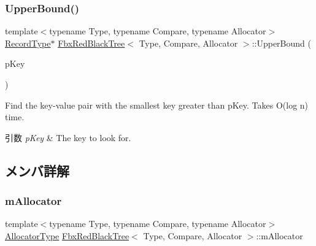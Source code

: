 \subsubsection{\texorpdfstring{Upper\+Bound()}{UpperBound()}\hspace{0.1cm}{\footnotesize\ttfamily [2/2]}}
{\footnotesize\ttfamily template$<$typename Type, typename Compare, typename Allocator$>$ \\
\hyperlink{class_fbx_red_black_tree_1_1_record_type}{Record\+Type}$\ast$ \hyperlink{class_fbx_red_black_tree}{Fbx\+Red\+Black\+Tree}$<$ Type, Compare, Allocator $>$\+::Upper\+Bound (\begin{DoxyParamCaption}\item[{const \hyperlink{class_fbx_red_black_tree_a241b31c6972995417d193458b7bb27e2}{Key\+Type} \&}]{p\+Key }\end{DoxyParamCaption})}

Find the key-\/value pair with the smallest key greater than p\+Key. Takes O(log n) time. 
\begin{DoxyParams}{引数}
{\em p\+Key} & The key to look for. \\
\hline
\end{DoxyParams}


\subsection{メンバ詳解}
\mbox{\label{class_fbx_red_black_tree_aefc2938bd74cea7e072d344d5b038af1}} 
\subsubsection{\texorpdfstring{m\+Allocator}{mAllocator}}
{\footnotesize\ttfamily template$<$typename Type, typename Compare, typename Allocator$>$ \\
\hyperlink{class_fbx_red_black_tree_a62c49ab2e7d602aac98a9413e490ca90}{Allocator\+Type} \hyperlink{class_fbx_red_black_tree}{Fbx\+Red\+Black\+Tree}$<$ Type, Compare, Allocator $>$\+::m\+Allocator\hspace{0.3cm}{\ttfamily [protected]}}

\mbox{\label{class_fbx_red_black_tree_a1c8e942b25077e380f93a61aaadd8679}} 
